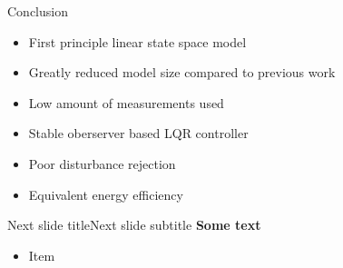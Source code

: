 \begin{frame}{Conclusion}
	 \begin{itemize}
	 	\item First principle linear state space model 
	 	\item Greatly reduced model size compared to previous work
	 	\item Low amount of measurements used
	 	\item Stable oberserver based LQR controller 
	 	\item Poor disturbance rejection
	 	\item Equivalent energy efficiency
	 \end{itemize}
\end{frame}


\begin{frame}{Next slide title}{Next slide subtitle}
	 \textbf{Some text}
	\begin{itemize}
		\item Item
	\end{itemize}
\end{frame}

